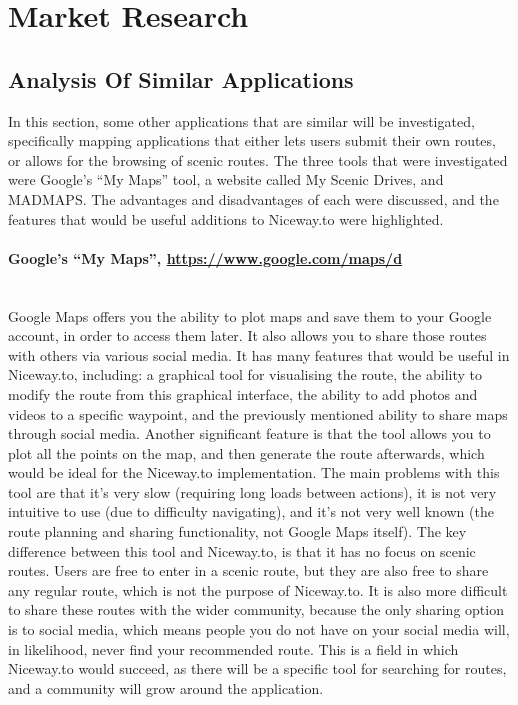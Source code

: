 \documentclass[a4paper,twoside,notitlepage,11pt]{article}
\begin{document}
\section{Market Research}
\subsection{Analysis Of Similar Applications}
In this section, some other applications that are similar will be investigated, specifically mapping applications that either lets users submit their own routes, or allows for the browsing of scenic routes. The three tools that were investigated were Google's ``My Maps'' tool, a website called My Scenic Drives, and MADMAPS. The advantages and disadvantages of each were discussed, and the features that would be useful additions to Niceway.to were highlighted.

\paragraph{Google's ``My Maps'', \url{https://www.google.com/maps/d}}\ \\
Google Maps offers you the ability to plot maps and save them to your Google account, in order to access them later. It also allows you to share those routes with others via various social media. It has many features that would be useful in Niceway.to, including: a graphical tool for visualising the route, the ability to modify the route from this graphical interface, the ability to add photos and videos to a specific waypoint, and the previously mentioned ability to share maps through social media. Another significant feature is that the tool allows you to plot all the points on the map, and then generate the route afterwards, which would be ideal for the Niceway.to implementation. The main problems with this tool are that it's very slow (requiring long loads between actions), it is not very intuitive to use (due to difficulty navigating), and it's not very well known (the route planning and sharing functionality, not Google Maps itself). The key difference between this tool and Niceway.to, is that it has no focus on scenic routes. Users are free to enter in a scenic route, but they are also free to share any regular route, which is not the purpose of Niceway.to. It is also more difficult to share these routes with the wider community, because the only sharing option is to social media, which means people you do not have on your social media will, in likelihood, never find your recommended route. This is a field in which Niceway.to would succeed, as there will be a specific tool for searching for routes, and a community will grow around the application. 
\end{document}
